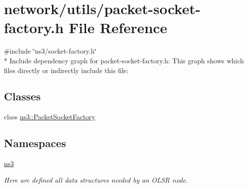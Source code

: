 \hypertarget{packet-socket-factory_8h}{}\section{network/utils/packet-\/socket-\/factory.h File Reference}
\label{packet-socket-factory_8h}
{\ttfamily \#include \char`\"{}ns3/socket-\/factory.\+h\char`\"{}}\\*
Include dependency graph for packet-\/socket-\/factory.h\+:
This graph shows which files directly or indirectly include this file\+:
\subsection*{Classes}
\begin{DoxyCompactItemize}
\item 
class \hyperlink{classns3_1_1PacketSocketFactory}{ns3\+::\+Packet\+Socket\+Factory}
\end{DoxyCompactItemize}
\subsection*{Namespaces}
\begin{DoxyCompactItemize}
\item 
 \hyperlink{namespacens3}{ns3}
\begin{DoxyCompactList}\small\item\em Here are defined all data structures needed by an O\+L\+SR node. \end{DoxyCompactList}\end{DoxyCompactItemize}
